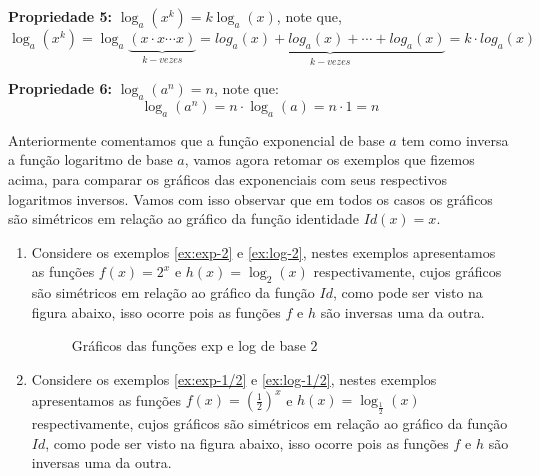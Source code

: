   \textbf{Propriedade 5:} $\log_{a}(x^k)= k \log_{a}(x)$, note que,
  \[\log_{a}(x^k)= \log_{a}\underbrace{(x \cdot x \cdots x)}_{k-vezes}= \underbrace{log_{a}(x) + log_{a}(x)+ \cdots + log_{a}(x)}_{k-vezes}= k \cdot log_{a}(x)\]
  \fim

  \textbf{Propriedade 6:} $\log_{a}(a^n)= n$, note que:
  \[\log_{a}(a^n)= n \cdot \log_{a}(a)= n \cdot 1 = n\]
  \fim

  Anteriormente comentamos que a função exponencial de base $a$ tem como inversa a função logaritmo de base $a$, vamos agora retomar os exemplos que fizemos acima, para comparar os gráficos das exponenciais com seus respectivos logaritmos inversos. Vamos com isso observar que em todos os casos os gráficos são simétricos em relação ao gráfico da função identidade $Id(x)= x$.

  \begin{enumerate}
   \item Considere os exemplos \autoref{ex:exp-2} e \autoref{ex:log-2}, nestes exemplos apresentamos as funções $f(x)= 2^x$ e $h(x)= \log_{2}(x)$ respectivamente, cujos gráficos são simétricos em relação ao gráfico da função $Id$, como pode ser visto na figura abaixo, isso ocorre pois as funções $f$ e $h$ são inversas uma da outra.

   \begin{figure}[H]
    \centering
    \caption{Gráficos das funções exp e log de base $2$}
   \end{figure}

   \item Considere os exemplos \autoref{ex:exp-1/2} e \autoref{ex:log-1/2}, nestes exemplos apresentamos as funções $f(x)= \left(\frac{1}{2}\right)^x$ e $h(x)= \log_{\frac{1}{2}}(x)$ respectivamente, cujos gráficos são simétricos em relação ao gráfico da função $Id$, como pode ser visto na figura abaixo, isso ocorre pois as funções $f$ e $h$ são inversas uma da outra.


\end{enumerate}
